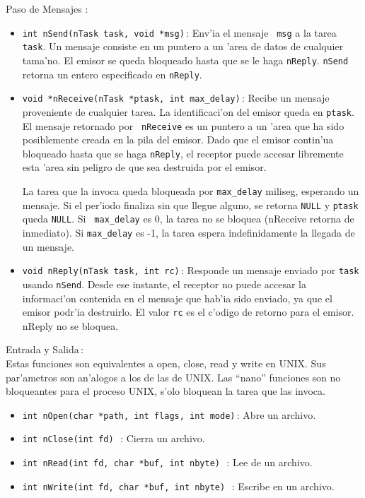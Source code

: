 Paso de Mensajes :

\begin{itemize}

\item {\tt int nSend(nTask task, void *msg)}\,: Env'ia el mensaje {\tt
msg} a la tarea {\tt task}.  Un mensaje consiste en un puntero a un
'area de datos de cualquier tama'no.  El emisor se queda bloqueado
hasta que se le haga {\tt nReply}. {\tt nSend} retorna un entero
especificado en {\tt nReply}.

\item {\tt void *nReceive(nTask *ptask, int max\_delay)}\,:
Recibe un mensaje proveniente de cualquier tarea.  La identificaci'on
del emisor queda en {\tt *ptask}.  El mensaje retornado por {\tt
nReceive} es un puntero a un 'area que ha sido posiblemente creada en
la pila del emisor.  Dado que el emisor contin'ua bloqueado hasta que
se haga {\tt nReply}, el receptor puede accesar libremente esta 'area
sin peligro de que sea destruida por el emisor.

La tarea que la invoca queda bloqueada por {\tt max\_delay} miliseg,
esperando un mensaje. Si el per'iodo finaliza sin que llegue alguno,
se retorna {\tt NULL} y {\tt *ptask} queda {\tt NULL}.  Si {\tt
max\_delay} es 0, la tarea no se bloquea (nReceive retorna de
inmediato). Si {\tt max\_delay} es -1, la tarea espera indefinidamente
la llegada de un mensaje.


\item {\tt void nReply(nTask task, int rc)}\,: Responde un mensaje
enviado por {\tt task} usando {\tt nSend}.  Desde ese instante, el
receptor no puede accesar la informaci'on contenida en el mensaje que
hab'ia sido enviado, ya que el emisor podr'ia destruirlo.  El valor
{\tt rc} es el c'odigo de retorno para el emisor. nReply no se
bloquea.

\end{itemize}

Entrada y Salida\,:\\

Estas funciones son equivalentes a open, close, read y write en
UNIX. Sus par'ametros son an'alogos a los de las de UNIX.
Las ``nano'' funciones son no bloqueantes para el proceso UNIX,
s'olo bloquean la tarea que las invoca. 

\begin{itemize}

\item {\tt int nOpen(char *path, int flags, int mode)}\,: Abre un archivo.

\item {\tt int nClose(int fd) }\,: Cierra un archivo.

\item {\tt int nRead(int fd, char *buf, int nbyte) }\,: Lee de un archivo.

\item {\tt int nWrite(int fd, char *buf, int nbyte) }\,: Escribe en un archivo.

\end{itemize}

